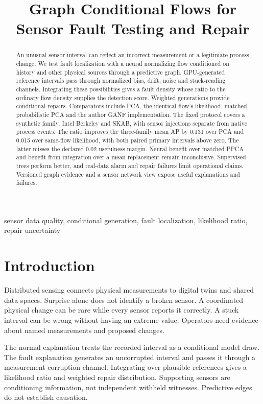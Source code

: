 \documentclass[conference]{IEEEtran}
\title{Graph Conditional Flows for Sensor Fault Testing and Repair}
\author{\IEEEauthorblockN{Alexander V. Mantzaris}
\IEEEauthorblockA{School of Data, Mathematical and Statistical Sciences\\University of Central Florida\\Orlando, FL, USA\\alexander.mantzaris@ucf.edu}}
\newcommand{\1}{\mathbf{1}}
\begin{document}
\maketitle
\begin{abstract}
An unusual sensor interval can reflect an incorrect measurement or a legitimate process change. We test fault localization with a neural normalizing flow conditioned on history and other physical sources through a predictive graph. GPU-generated reference intervals pass through normalized bias, drift, noise and stuck-reading channels. Integrating these possibilities gives a fault density whose ratio to the ordinary flow density supplies the detection score. Weighted generations provide conditional repairs. Comparators include PCA, the identical flow's likelihood, matched probabilistic PCA and the author GANF implementation. The fixed protocol covers a synthetic family, Intel Berkeley and SKAB, with sensor injections separate from native process events. %
The ratio improves the three-family mean AP by 0.131 over PCA and 0.015 over same-flow likelihood, with both paired primary intervals above zero. The latter misses the declared 0.02 usefulness margin. Neural benefit over matched PPCA and benefit from integration over a mean replacement remain inconclusive. Supervised trees perform better, and real-data alarm and repair failures limit operational claims.
 Versioned graph evidence and a sensor network view expose useful explanations and failures.
\end{abstract}
\begin{IEEEkeywords}
sensor data quality, conditional generation, fault localization, likelihood ratio, repair uncertainty
\end{IEEEkeywords}

\section{Introduction}
Distributed sensing connects physical measurements to digital twins and shared data spaces. Surprise alone does not identify a broken sensor. A coordinated physical change can be rare while every sensor reports it correctly. A stuck interval can be wrong without having an extreme value. Operators need evidence about named measurements and proposed changes.

The normal explanation treats the recorded interval as a conditional model draw. The fault explanation generates an uncorrupted interval and passes it through a measurement corruption channel. Integrating over plausible references gives a likelihood ratio and weighted repair distribution. Supporting sensors are conditioning information, not independent withheld witnesses. Predictive edges do not establish causation.
\end{document}
